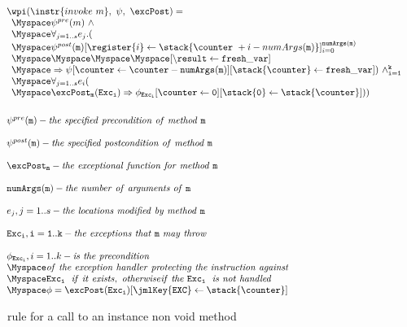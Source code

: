 \begin{figure}[!ht]
$$
\begin{array}{l}
\wpi(\instr{invoke \  m}, \ \psi ,\ \excPost) =\\ 
\begin{array}{l}
\Myspace \psi^{pre}(m) \ \wedge \\
\Myspace  \forall_{j = 1..s} e_{j}.( \\
\Myspace \psi^{post}( \texttt{m})[\register{i}  \leftarrow \stack{\counter \ + i - numArgs( \texttt{m}) }]_{i=0}^{\tt{numArgs(\texttt{m} )}}  \\
\Myspace \Myspace\Myspace \Myspace[\tt{\backslash result} \leftarrow fresh\_var] \\
\Myspace \Rightarrow  \psi[\counter \leftarrow \counter - \tt{numArgs}( \texttt{m} )][\stack{\counter }  \leftarrow \tt{fresh\_var}]) \ \wedge_{i = 1}^k \\
\Myspace \forall_{j = 1..s} e_i ( \\
\Myspace \excPost_{\tt{m} }( \tt{Exc_i} ) \Rightarrow  \phi_{\tt{Exc_i} }[ \counter \leftarrow  0][\stack{0} \leftarrow \stack{\counter}]   ) ) \\		
\end{array} \\[15 mm]
\\
\psi^{pre}(\texttt{m}) - \it{ the \ specified \ precondition \ of \ method \ }\texttt{m} \\
\\
\psi^{post}(\texttt{m}) - \it{the \ specified \ postcondition \ of \ method \ }\texttt{m}  \\
\\
\excPost_{\texttt{m}} - \it{ the \ exceptional \ function \ for \ method \ }\texttt{m}  \\
\\
\tt{numArgs}( \texttt{m} ) - \it{ the \  number \ of \ arguments \ of \ }\texttt{m} \\  
\\
e_{j} , j = 1 .. s - \it{ the \ locations \ modified \ by \ method \ }\texttt{m} \\
\\
\tt{Exc_i}, i = 1.. k - \it{ the \ exceptions \ that \ } \texttt{m} \ \it{may \ throw} \\
\\
\phi_{\tt{Exc_i}}, i = 1..k -   \it{is \ the \ precondition } \\
\Myspace   \it{of \ the \  exception \ handler \ protecting \ the \ instruction \  against} \\
\Myspace   \tt{Exc_i} \ \it{\ if \ it \  exists, \ otherwise} \it{if \ the } \ \tt{Exc_i} \ \it{\ is \ not \ handled}    \\
\Myspace      \phi = \excPost( \tt{Exc_i})[ \jmlKey{EXC} \leftarrow \stack{\counter}]
\end{array}
$$
\caption{\wpi \ rule for a call to an instance non void method}
\label{wpInv}
\end{figure}
